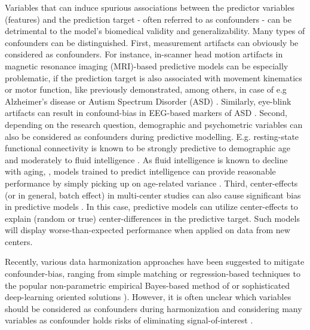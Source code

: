 \documentclass{article}
\begin{document}
Variables that can induce spurious associations between the predictor variables (features) and the prediction target - often referred to as confounders - can be detrimental to the model's biomedical validity and generalizability. Many types of confounders can be distinguished.
First, measurement artifacts can obviously be considered as confounders. For instance, in-scanner head motion artifacts in magnetic resonance imaging (MRI)-based predictive models can be especially problematic, if the prediction target is also associated with movement kinematics or motor function, like previously demonstrated, among others, in case of e.g Alzheimer's disease \citep{rao2017predictive} or Autism Spectrum Disorder (ASD) \citep{spisak2014voxel, spisak2019optimal, gotts2013perils}. Similarly, eye-blink artifacts can result in confound-bias in EEG-based markers of ASD  \citep{eldridge2014robust}.
Second, depending on the research question, demographic and psychometric variables can also be considered as confounders during predictive modelling. E.g. resting-state functional connectivity is known to be strongly predictive to  demographic age \citep{wang2012decoding, dukart2011age} and moderately to fluid intelligence \citep{he2020deep, cole2012global}. As fluid intelligence is known to decline with aging, \citep{kievit2018neural}, models trained to predict intelligence can provide reasonable performance by simply picking up on age-related variance \cite{lohmann2021predicting, dubois2018distributed}. 
Third, center-effects (or in general, batch effect) in multi-center studies can also cause significant bias in predictive models \citep{leek2010tackling, da2020performance}. In this case, predictive models can utilize center-effects to explain (random or true) center-differences in the predictive target. Such models will display worse-than-expected performance when applied on data from new centers.

Recently, various data harmonization approaches have been suggested to mitigate confounder-bias, ranging from simple matching \citep{rao2017predictive} or regression-based techniques \citep{rao2017predictive, dukart2011age, spisak2014voxel, abdulkadir2014reduction} to the popular non-parametric empirical Bayes-based method of \cite{johnson2007adjusting} or sophisticated deep-learning oriented solutions \citep{zhao2020training, hognon2019standardization}). However, it is often unclear which variables should be considered as confounders during harmonization and considering many variables as confounder holds risks of eliminating signal-of-interest \citep{wachinger2021detect}.
\end{document}
